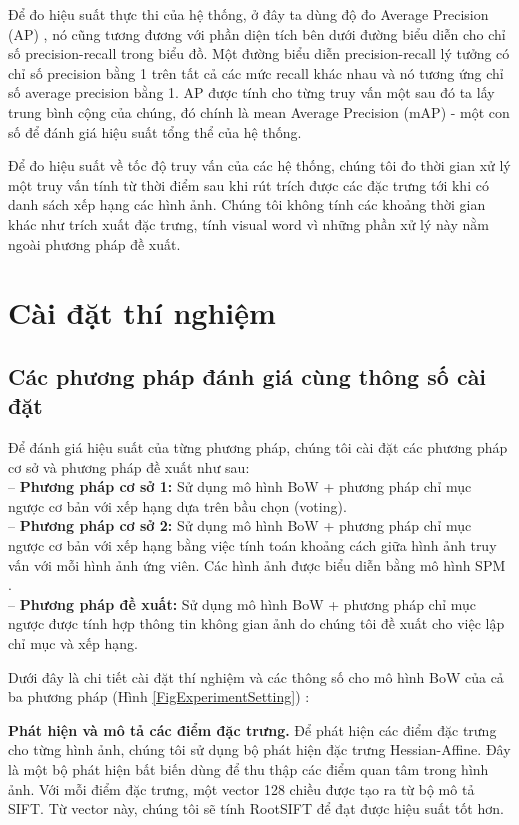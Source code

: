 Để đo hiệu suất thực thi của hệ thống, ở đây ta dùng độ đo Average Precision (AP) \cite{philbin2007object}, nó cũng tương đương với phần diện tích bên dưới đường biểu diễn cho chỉ số precision-recall trong biểu đồ. Một đường biểu diễn precision-recall lý tưởng có chỉ số precision bằng 1 trên tất cả các mức recall khác nhau và nó tương ứng chỉ số average precision bằng 1. AP được tính cho từng truy vấn một sau đó ta lấy trung bình cộng của chúng, đó chính là mean Average Precision (mAP) - một con số để đánh giá hiệu suất tổng thể của hệ thống.

Để đo hiệu suất về tốc độ truy vấn của các hệ thống, chúng tôi đo thời gian xử lý một truy vấn tính từ thời điểm sau khi rút trích được các đặc trưng tới khi có danh sách xếp hạng các hình ảnh. Chúng tôi không tính các khoảng thời gian khác như trích xuất đặc trưng, tính visual word vì những phần xử lý này nằm ngoài phương pháp đề xuất.

\section{Cài đặt thí nghiệm}
\label{experimental-setting}
\subsection{Các phương pháp đánh giá cùng thông số cài đặt}
Để đánh giá hiệu suất của từng phương pháp, chúng tôi cài đặt các phương pháp cơ sở và phương pháp đề xuất như sau:\\
-- \textbf{Phương pháp cơ sở 1:} Sử dụng mô hình BoW + phương pháp chỉ mục ngược cơ bản với xếp hạng dựa trên bầu chọn (voting).\\
-- \textbf{Phương pháp cơ sở 2:} Sử dụng mô hình BoW + phương pháp chỉ mục ngược cơ bản với xếp hạng bằng việc tính toán khoảng cách giữa hình ảnh truy vấn với mỗi hình ảnh ứng viên. Các hình ảnh được biểu diễn bằng mô hình SPM \cite{lazebnik2006beyond}.\\
-- \textbf{Phương pháp đề xuất:} Sử dụng mô hình BoW + phương pháp chỉ mục ngược được tính hợp thông tin không gian ảnh do chúng tôi đề xuất cho việc lập chỉ mục và xếp hạng.

Dưới đây là chi tiết cài đặt thí nghiệm và các thông số cho mô hình BoW của cả ba phương pháp (Hình \ref{FigExperimentSetting}) :

\textbf{Phát hiện và mô tả các điểm đặc trưng.} Để phát hiện các điểm đặc trưng cho từng hình ảnh, chúng tôi sử dụng bộ phát hiện đặc trưng Hessian-Affine\cite{mikolajczyk2005comparison}. Đây là một bộ phát hiện bất biến dùng để thu thập các điểm quan tâm trong hình ảnh. Với mỗi điểm đặc trưng, một vector 128 chiều được tạo ra từ bộ mô tả SIFT. Từ vector này, chúng tôi sẽ tính RootSIFT\cite{arandjelovic2012three} để đạt được hiệu suất tốt hơn.


